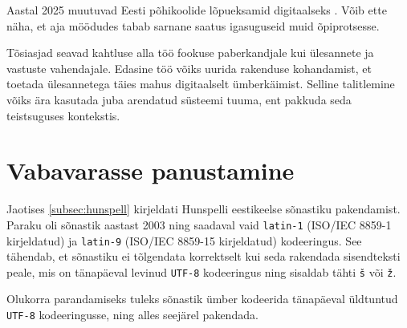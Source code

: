Aastal 2025 muutuvad Eesti põhikoolide lõpueksamid digitaalseks \cite{digital-exams}. Võib ette näha, et aja möödudes tabab sarnane saatus igasuguseid muid õpiprotsesse.

Tõsiasjad seavad kahtluse alla töö fookuse paberkandjale kui ülesannete ja vastuste vahendajale. Edasine töö võiks uurida rakenduse kohandamist, et toetada ülesannetega täies mahus digitaalselt ümberkäimist. Selline talitlemine võiks ära kasutada juba arendatud süsteemi tuuma, ent pakkuda seda teistsuguses kontekstis.

\section{Vabavarasse panustamine}

Jaotises \ref{subsec:hunspell} kirjeldati Hunspelli eestikeelse sõnastiku pakendamist. Paraku oli sõnastik aastast 2003 ning saadaval vaid \texttt{latin-1} (ISO/IEC 8859-1 kirjeldatud) ja \texttt{latin-9} (ISO/IEC 8859-15 kirjeldatud) kodeeringus. See tähendab, et sõnastiku ei tõlgendata korrektselt kui seda rakendada sisendteksti peale, mis on tänapäeval levinud \texttt{UTF-8} kodeeringus ning sisaldab tähti \texttt{š} või \texttt{ž}.

Olukorra parandamiseks tuleks sõnastik ümber kodeerida tänapäeval üldtuntud \texttt{UTF-8} kodeeringusse, ning alles seejärel pakendada.


